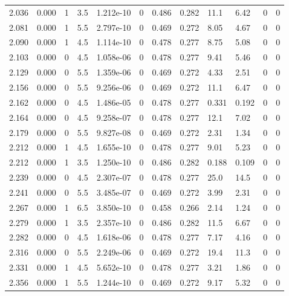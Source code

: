 \documentclass[preview]{standalone}
\begin{document}
{{{{\begin{tabular}{L{1.2cm}C{1.2cm} C{0.3cm}C{0.5cm} C{1.4cm}C{1.4cm} C{1.4cm}C{1.4cm} C{1.6cm}C{1.6cm} C{1.6cm}C{1.6cm}}
  2.036  &  0.000  & 1     & 3.5 &  1.212e-10  & 0  &  0.486&   0.282& 11.1 & 6.42   &  0 & 0  \\ 
  2.081  &  0.000  & 1     & 5.5 &  2.797e-10  & 0  &  0.469&   0.272& 8.05 & 4.67   &  0 & 0  \\ 
  2.090  &  0.000  & 1     & 4.5 &  1.114e-10  & 0  &  0.478&   0.277& 8.75 & 5.08   &  0 & 0  \\ 
  2.103  &  0.000  & 0     & 4.5 &  1.058e-06  & 0  &  0.478&   0.277& 9.41 & 5.46   &  0 & 0  \\ 
  2.129  &  0.000  & 0     & 5.5 &  1.359e-06  & 0  &  0.469&   0.272& 4.33 & 2.51   &  0 & 0  \\ 
  2.156  &  0.000  & 0     & 5.5 &  9.256e-06  & 0  &  0.469&   0.272& 11.1 & 6.47   &  0 & 0  \\ 
  2.162  &  0.000  & 0     & 4.5 &  1.486e-05  & 0  &  0.478&   0.277& 0.331 & 0.192   &  0 & 0  \\ 
  2.164  &  0.000  & 0     & 4.5 &  9.258e-07  & 0  &  0.478&   0.277& 12.1 & 7.02   &  0 & 0  \\ 
  2.179  &  0.000  & 0     & 5.5 &  9.827e-08  & 0  &  0.469&   0.272& 2.31 & 1.34   &  0 & 0  \\ 
  2.212  &  0.000  & 1     & 4.5 &  1.655e-10  & 0  &  0.478&   0.277& 9.01 & 5.23   &  0 & 0  \\ 
  2.212  &  0.000  & 1     & 3.5 &  1.250e-10  & 0  &  0.486&   0.282& 0.188 & 0.109   &  0 & 0  \\ 
  2.239  &  0.000  & 0     & 4.5 &  2.307e-07  & 0  &  0.478&   0.277& 25.0 & 14.5   &  0 & 0  \\ 
  2.241  &  0.000  & 0     & 5.5 &  3.485e-07  & 0  &  0.469&   0.272& 3.99 & 2.31   &  0 & 0  \\ 
  2.267  &  0.000  & 1     & 6.5 &  3.850e-10  & 0  &  0.458&   0.266& 2.14 & 1.24   &  0 & 0  \\ 
  2.279  &  0.000  & 1     & 3.5 &  2.357e-10  & 0  &  0.486&   0.282& 11.5 & 6.67   &  0 & 0  \\ 
  2.282  &  0.000  & 0     & 4.5 &  1.618e-06  & 0  &  0.478&   0.277& 7.17 & 4.16   &  0 & 0  \\ 
  2.316  &  0.000  & 0     & 5.5 &  2.249e-06  & 0  &  0.469&   0.272& 19.4 & 11.3   &  0 & 0  \\ 
  2.331  &  0.000  & 1     & 4.5 &  5.652e-10  & 0  &  0.478&   0.277& 3.21 & 1.86   &  0 & 0  \\ 
  2.356  &  0.000  & 1     & 5.5 &  1.244e-10  & 0  &  0.469&   0.272& 9.17 & 5.32   &  0 & 0  \\ 

\end{tabular}}}}}
\end{document}
